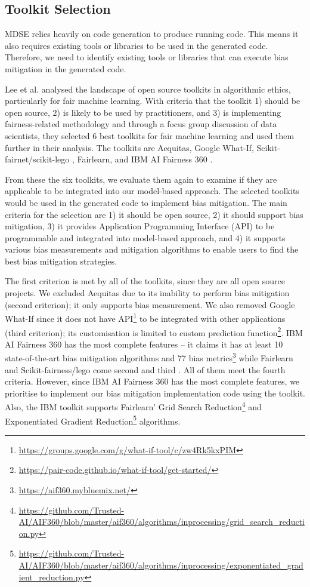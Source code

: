 \documentclass[sigconf,review]{acmart}
\begin{document}
\subsection{Toolkit Selection}
\label{sec:toolkit_selection}
MDSE relies heavily on code generation to produce running code. This means it also requires existing tools or libraries to be used in the generated code. Therefore, we need to identify existing tools or libraries that can execute bias mitigation in the generated code. 

Lee et al. \cite{lee2021landscape} analysed the landscape of open source toolkits in algorithmic ethics, particularly for fair machine learning. With criteria that the toolkit 1) should be open source, 2) is likely to be used by practitioners, and 3) is implementing fairness-related methodology and through a focus group discussion of data scientists, they selected 6 best toolkits for fair machine learning and used them further in their analysis. The toolkits are Aequitas\cite{saleiro2019aequitas}, Google What-If\cite{googlewhatif2020}, Scikit-fairnet/scikit-lego \cite{scikitfairness2022,scikitlego2022}, Fairlearn\cite{bird2020fairlearn}, and IBM AI Fairness 360 \cite{bellamy2018ai}.  

From these the six toolkits, we evaluate them again to examine if they are applicable to be integrated into our model-based approach. The selected toolkits would be used in the generated code to implement bias mitigation. The main criteria for the selection are 1) it should be open source, 2) it should support bias mitigation, 3) it provides Application Programming Interface (API) to be programmable and integrated into model-based approach, and 4) it supports various bias measurements and mitigation algorithms to enable users to find the best bias mitigation strategies. 

The first criterion is met by all of the toolkits, since they are all open source projects. We excluded Aequitas due to its inability to perform bias mitigation (second criterion); it only supports bias measurement. We also removed Google What-If since it does not have API\footnote{\url{https://groups.google.com/g/what-if-tool/c/zw4Rk5kxPIM}} to be integrated with other applications (third criterion); its customisation is limited to custom prediction function\footnote{\url{https://pair-code.github.io/what-if-tool/get-started/}}. IBM AI Fairness 360 has the most complete features -- it claims it has at least 10 state-of-the-art bias mitigation algorithms and 77 bias metrics\footnote{\url{https://aif360.mybluemix.net/}} while Fairlearn and Scikit-fairness/lego come second and third \cite{lee2021landscape}. All of them meet the fourth criteria. However, since IBM AI Fairness 360 has the most complete features, we prioritise to implement our bias mitigation implementation code using the toolkit. Also, the IBM toolkit supports Fairlearn' Grid Search Reduction\footnote{\url{https://github.com/Trusted-AI/AIF360/blob/master/aif360/algorithms/inprocessing/grid\_search\_reduction.py}} and Exponentiated Gradient Reduction\footnote{\url{https://github.com/Trusted-AI/AIF360/blob/master/aif360/algorithms/inprocessing/exponentiated\_gradient\_reduction.py}} algorithms.
\end{document}
